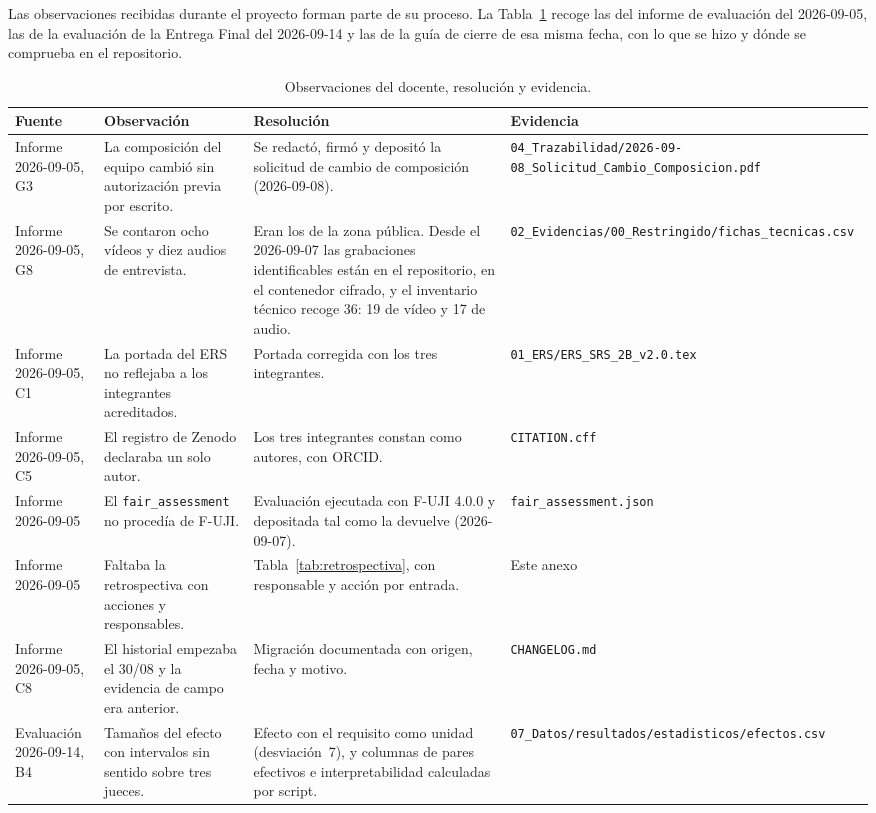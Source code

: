 \documentclass[11pt,a4paper]{article}
\begin{document}
Las observaciones recibidas durante el proyecto forman parte de su proceso. La
Tabla~\ref{tab:observaciones} recoge las del informe de evaluaci\'on del 2026-09-05, las de la
evaluaci\'on de la Entrega Final del 2026-09-14 y las de la gu\'ia de cierre de esa misma fecha,
con lo que se hizo y d\'onde se comprueba en el repositorio.

{\footnotesize
\begin{longtable}{p{2.1cm}p{3.9cm}p{4.9cm}p{3.3cm}}
\caption{Observaciones del docente, resoluci\'on y evidencia.}\label{tab:observaciones}\\
\toprule
\textbf{Fuente} & \textbf{Observaci\'on} & \textbf{Resoluci\'on} & \textbf{Evidencia} \\
\midrule
\endhead
Informe 2026-09-05, G3 & La composici\'on del equipo cambi\'o sin autorizaci\'on previa por escrito. & Se redact\'o, firm\'o y deposit\'o la solicitud de cambio de composici\'on (2026-09-08). & \nolinkurl{04_Trazabilidad/2026-09-08_Solicitud_Cambio_Composicion.pdf} \\
Informe 2026-09-05, G8 & Se contaron ocho v\'ideos y diez audios de entrevista. & Eran los de la zona p\'ublica. Desde el 2026-09-07 las grabaciones identificables est\'an en el repositorio, en el contenedor cifrado, y el inventario t\'ecnico recoge 36: 19 de v\'ideo y 17 de audio. & \nolinkurl{02_Evidencias/00_Restringido/fichas_tecnicas.csv} \\
Informe 2026-09-05, C1 & La portada del ERS no reflejaba a los integrantes acreditados. & Portada corregida con los tres integrantes. & \nolinkurl{01_ERS/ERS_SRS_2B_v2.0.tex} \\
Informe 2026-09-05, C5 & El registro de Zenodo declaraba un solo autor. & Los tres integrantes constan como autores, con ORCID. & \nolinkurl{CITATION.cff} \\
Informe 2026-09-05 & El \texttt{fair\_assessment} no proced\'ia de F-UJI. & Evaluaci\'on ejecutada con F-UJI 4.0.0 y depositada tal como la devuelve (2026-09-07). & \nolinkurl{fair_assessment.json} \\
Informe 2026-09-05 & Faltaba la retrospectiva con acciones y responsables. & Tabla~\ref{tab:retrospectiva}, con responsable y acci\'on por entrada. & Este anexo \\
Informe 2026-09-05, C8 & El historial empezaba el 30/08 y la evidencia de campo era anterior. & Migraci\'on documentada con origen, fecha y motivo. & \nolinkurl{CHANGELOG.md} \\
Evaluaci\'on 2026-09-14, B4 & Tama\~nos del efecto con intervalos sin sentido sobre tres jueces. & Efecto con el requisito como unidad (desviaci\'on~7), y columnas de pares efectivos e interpretabilidad calculadas por script. & \nolinkurl{07_Datos/resultados/estadisticos/efectos.csv} \\

\end{longtable}}
\end{document}
